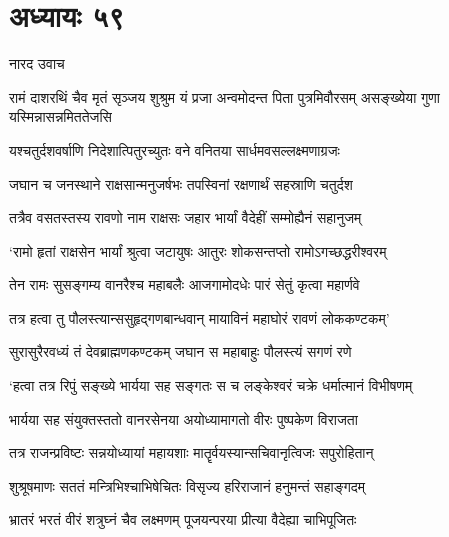 
\translink{}

\storymeta


\chapter{अध्यायः ५९}
\twolineshloka
{नारद उवाच}
{}


\threelineshloka
{रामं दाशरथिं चैव मृतं सृञ्जय शुश्रुम}
{यं प्रजा अन्वमोदन्त पिता पुत्रमिवौरसम्}
{असङ्ख्येया गुणा यस्मिन्नासन्नमिततेजसि}


\twolineshloka
{यश्चतुर्दशवर्षाणि निदेशात्पितुरच्युतः}
{वने वनितया सार्धमवसल्लक्ष्मणाग्रजः}


\twolineshloka
{जघान च जनस्थाने राक्षसान्मनुजर्षभः}
{तपस्विनां रक्षणार्थं सहस्राणि चतुर्दश}


\twolineshloka
{तत्रैव वसतस्तस्य रावणो नाम राक्षसः}
{जहार भार्यां वैदेहीं सम्मोह्यैनं सहानुजम्}


\twolineshloka
{`रामो हृतां राक्षसेन भार्यां श्रुत्वा जटायुषः}
{आतुरः शोकसन्तप्तो रामोऽगच्छद्धरीश्वरम्}


\twolineshloka
{तेन रामः सुसङ्गम्य वानरैश्च महाबलैः}
{आजगामोदधेः पारं सेतुं कृत्वा महार्णवे}


\twolineshloka
{तत्र हत्वा तु पौलस्त्यान्ससुहृद्गणबान्धवान्}
{मायाविनं महाघोरं रावणं लोककण्टकम्'}


\twolineshloka
{सुरासुरैरवध्यं तं देवब्राह्मणकण्टकम्}
{जघान स महाबाहुः पौलस्त्यं सगणं रणे}


\twolineshloka
{`हत्वा तत्र रिपुं सङ्ख्ये भार्यया सह सङ्गतः}
{स च लङ्केश्वरं चक्रे धर्मात्मानं विभीषणम्}


\twolineshloka
{भार्यया सह संयुक्तस्ततो वानरसेनया}
{अयोध्यामागतो वीरः पुष्पकेण विराजता}


\twolineshloka
{तत्र राजन्प्रविष्टः सन्नयोध्यायां महायशाः}
{मातॄर्वयस्यान्सचिवानृत्विजः सपुरोहितान्}


\twolineshloka
{शुश्रूषमाणः सततं मन्त्रिभिश्चाभिषेचितः}
{विसृज्य हरिराजानं हनुमन्तं सहाङ्गदम्}


\twolineshloka
{भ्रातरं भरतं वीरं शत्रुघ्नं चैव लक्ष्मणम्}
{पूजयन्परया प्रीत्या वैदेह्या चाभिपूजितः}


